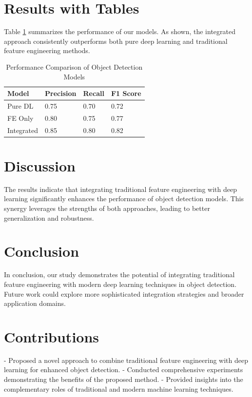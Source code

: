 \documentclass{article}
\begin{document}
\section{Results with Tables}
Table \ref{tab:results} summarizes the performance of our models. As shown, the integrated approach consistently outperforms both pure deep learning and traditional feature engineering methods.

\begin{table}[htbp]
\centering
\caption{Performance Comparison of Object Detection Models}
\label{tab:results}
\begin{tabular}{@{}llll@{}}
\toprule
Model & Precision & Recall & F1 Score \\ \midrule
Pure DL & 0.75 & 0.70 & 0.72 \\
FE Only & 0.80 & 0.75 & 0.77 \\
Integrated & 0.85 & 0.80 & 0.82 \\ \bottomrule
\end{tabular}
\end{table}

\section{Discussion}
The results indicate that integrating traditional feature engineering with deep learning significantly enhances the performance of object detection models. This synergy leverages the strengths of both approaches, leading to better generalization and robustness.

\section{Conclusion}
In conclusion, our study demonstrates the potential of integrating traditional feature engineering with modern deep learning techniques in object detection. Future work could explore more sophisticated integration strategies and broader application domains.

\section{Contributions}
- Proposed a novel approach to combine traditional feature engineering with deep learning for enhanced object detection.
- Conducted comprehensive experiments demonstrating the benefits of the proposed method.
- Provided insights into the complementary roles of traditional and modern machine learning techniques.



\end{document}
